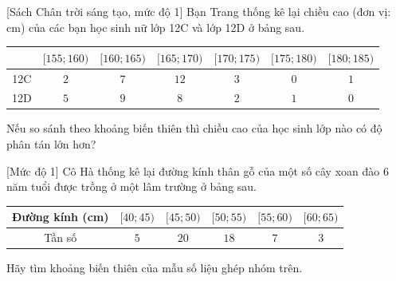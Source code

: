 \begin{bt}%
[Sách Chân trời sáng tạo, mức độ 1]
	Bạn Trang thống kê lại chiều cao (đơn vị: cm) của các bạn học sinh nữ lớp 12C và lớp 12D
	ở bảng sau.
	\begin{center}
		\begin{tabular}{|c|c|c|c|c|c|c|}
			\hline
			\diagbox[width=8em]{Lớp}{Chiều cao} & $[155;160)$ & $[160;165)$ & $[165;170)$ & $[170;175)$ & $[175;180)$ & $[180;185)$ \\
			\hline
			12C & $2$ & $7$ & $12$ & $3$ & $0$ & $1$ \\
			\hline
			12D & $5$ & $9$ & $8$ & $2$ & $1$ & $0$ \\
			\hline
		\end{tabular}
	\end{center}	
	Nếu so sánh theo khoảng biến thiên thì chiều cao của học sinh lớp nào có độ phân tán lớn hơn?
\end{bt}

\begin{bt}%
[Mức độ 1]
	Cô Hà thống kê lại đường kính thân gỗ của một số cây xoan đào 6 năm tuổi được trồng ở một lâm trường ở bảng sau.
	\begin{center}
		\begin{tabular}{|c|c|c|c|c|c|}
			\hline
			Đường kính (cm) & $[40;45)$ & $[45;50)$ & $[50;55)$ & $[55;60)$ & $[60;65)$ \\
			\hline
			Tần số & $5$ & $20$ & $18$ & $7$ & $3$ \\
			\hline
		\end{tabular}
	\end{center}
	Hãy tìm khoảng biến thiên của mẫu số liệu ghép nhóm trên.
\end{bt}

